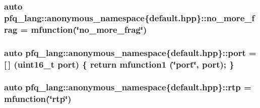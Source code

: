 \hypertarget{namespacepfq__lang_1_1anonymous__namespace_02default_8hpp_03_ac400453f07ca5fc4ef28d20085f149c2}{
\subsubsection[{no\+\_\+more\+\_\+frag}]{\setlength{\rightskip}{0pt plus 5cm}auto pfq\+\_\+lang\+::anonymous\+\_\+namespace\{default.\+hpp\}\+::no\+\_\+more\+\_\+frag = {\bf mfunction}(\char`\"{}no\+\_\+more\+\_\+frag\char`\"{})}}\label{namespacepfq__lang_1_1anonymous__namespace_02default_8hpp_03_ac400453f07ca5fc4ef28d20085f149c2}
\hypertarget{namespacepfq__lang_1_1anonymous__namespace_02default_8hpp_03_a1b370b44e5eedc364f3bb306d5042738}{
\subsubsection[{port}]{\setlength{\rightskip}{0pt plus 5cm}auto pfq\+\_\+lang\+::anonymous\+\_\+namespace\{default.\+hpp\}\+::port = \mbox{[}$\,$\mbox{]} (uint16\+\_\+t port) \{ return {\bf mfunction1} (\char`\"{}port\char`\"{}, port); \}}}\label{namespacepfq__lang_1_1anonymous__namespace_02default_8hpp_03_a1b370b44e5eedc364f3bb306d5042738}
\hypertarget{namespacepfq__lang_1_1anonymous__namespace_02default_8hpp_03_a13ac072f4d7f860256ef22d7f5a1a9ac}{
\subsubsection[{rtp}]{\setlength{\rightskip}{0pt plus 5cm}auto pfq\+\_\+lang\+::anonymous\+\_\+namespace\{default.\+hpp\}\+::rtp = {\bf mfunction}(\char`\"{}rtp\char`\"{})}}\label{namespacepfq__lang_1_1anonymous__namespace_02default_8hpp_03_a13ac072f4d7f860256ef22d7f5a1a9ac}
